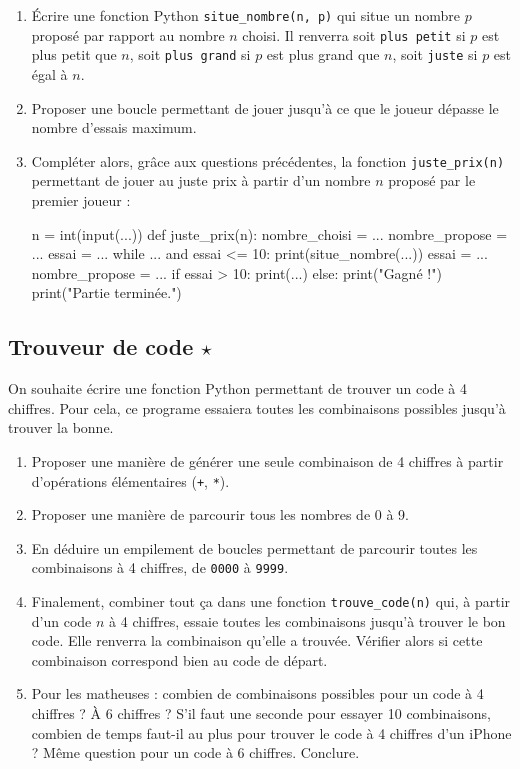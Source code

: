 \documentclass[12pt,a4paper, oneside]{article}
\theoremstyle{definition}
\begin{document}
   \begin{enumerate}
      \item Écrire une fonction Python \texttt{situe\_nombre(n, p)} qui situe un nombre $p$ proposé par rapport au nombre $n$ choisi.
      Il renverra soit \texttt{plus petit} si $p$ est plus petit que $n$, soit \texttt{plus grand} si $p$ est plus grand que $n$, soit \texttt{juste} si $p$ est égal à $n$.
      \item Proposer une boucle permettant de jouer jusqu'à ce que le joueur dépasse le nombre d'essais maximum.
      \item Compléter alors, grâce aux questions précédentes, la fonction \texttt{juste\_prix(n)} permettant de jouer au juste prix à partir d'un nombre $n$ proposé par le premier joueur :
      \begin{pyverbatim}
         n = int(input(...))
         def juste_prix(n):
            nombre_choisi = ...
            nombre_propose = ...
            essai = ...
            while ... and essai <= 10:
               print(situe_nombre(...))
               essai = ...
               nombre_propose = ...
            if essai > 10:
               print(...)
            else:
               print("Gagné !")
            print("Partie terminée.")
      \end{pyverbatim}
   \end{enumerate}

   \subsection{Trouveur de code $\star$}\label{subsec:trouveur-de-code}
   On souhaite écrire une fonction Python permettant de trouver un code à 4 chiffres.
   Pour cela, ce programe essaiera toutes les combinaisons possibles jusqu'à trouver la bonne.
   \begin{enumerate}
      \item Proposer une manière de générer une seule combinaison de 4 chiffres à partir d'opérations élémentaires (\texttt{+}, \texttt{*}).
      \item Proposer une manière de parcourir tous les nombres de 0 à 9.
      \item En déduire un empilement de boucles permettant de parcourir toutes les combinaisons à 4 chiffres, de \texttt{0000} à \texttt{9999}.
      \item Finalement, combiner tout ça dans une fonction \texttt{trouve\_code(n)} qui, à partir d'un code $n$ à 4 chiffres, essaie toutes les combinaisons jusqu'à trouver le bon code.
      Elle renverra la combinaison qu'elle a trouvée.
      Vérifier alors si cette combinaison correspond bien au code de départ.
      \item Pour les matheuses : combien de combinaisons possibles pour un code à 4 chiffres ?
      À 6 chiffres ?
      S'il faut une seconde pour essayer 10 combinaisons, combien de temps faut-il au plus pour trouver le code à 4 chiffres d'un iPhone ?
      Même question pour un code à 6 chiffres.
      Conclure.
   \end{enumerate}
\end{document}
